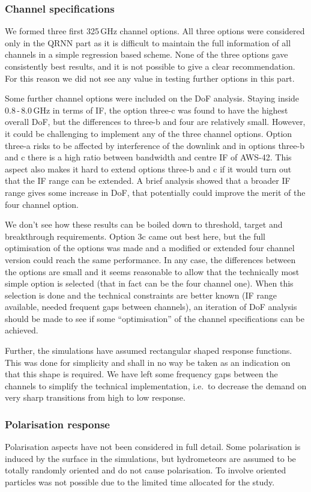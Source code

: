 \documentclass[12pt]{article}
\begin{document}
\subsubsection{Channel specifications}
%
We formed three first 325\,GHz channel options. All three options were
considered only in the QRNN part as it is difficult to maintain the full
information of all channels in a simple regression based scheme. None of the
three options gave consistently best results, and it is not possible to give a
clear recommendation. For this reason we did not see any value in testing
further options in this part.

Some further channel options were included on the DoF analysis. Staying inside
0.8\,-\,8.0\,GHz in terms of IF, the option three-c was found to have the
highest overall DoF, but the differences to three-b and four are relatively
small. However, it could be challenging to implement any of the three channel
options. Option three-a risks to be affected by interference of the downlink
and in options three-b and c there is a high ratio between bandwidth and centre
IF of AWS-42. This aspect also makes it hard to extend options three-b and c if
it would turn out that the IF range can be extended. A brief analysis showed
that a broader IF range gives some increase in DoF, that potentially could
improve the merit of the four channel option.

We don't see how these results can be boiled down to threshold, target and
breakthrough requirements. Option 3c came out best here, but the full
optimisation of the options was made and a modified or extended four channel
version could reach the same performance. In any case, the differences between
the options are small and it seems reasonable to allow that  the technically
most simple option is selected (that in fact can be the four channel one).
When this selection is done and the technical constraints are better known (IF
range available, needed frequent gaps between channels), an iteration of DoF
analysis should be made to see if some ``optimisation'' of the channel
specifications can be achieved.

Further, the simulations have assumed rectangular shaped response functions.
This was done for simplicity and shall in no way be taken as an indication on
that this shape is required. We have left some frequency gaps between the
channels to simplify the technical implementation, i.e.\ to decrease the demand
on very sharp transitions from high to low response. 


\subsubsection{Polarisation response}
%
Polarisation aspects have not been considered in full detail. Some polarisation
is induced by the surface in the simulations, but hydrometeors are assumed to
be totally randomly oriented and do not cause polarisation. To involve oriented
particles was not possible due to the limited time allocated for the study.
\end{document}
